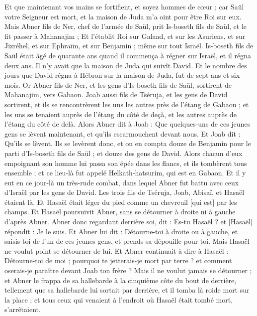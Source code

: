 \begin{multicols}{2}
Et que maintenant vos mains se fortifient, et soyez hommes de cœur ; car Saül votre Seigneur est mort, et la maison de Juda m'a oint pour être Roi sur eux.
Mais Abner fils de Ner, chef de l'armée de Saül, prit Is-boseth fils de Saül, et le fit passer à Mahanajim ;
Et l'établit Roi sur Galaad, et sur les Asuriens, et sur Jizréhel, et sur Ephraïm, et sur Benjamin ; même sur tout Israël.
Is-boseth fils de Saül était âgé de quarante ans quand il commença à régner sur Israël, et il régna deux ans. Il n'y avait que la maison de Juda qui suivît David.
Et le nombre des jours que David régna à Hébron sur la maison de Juda, fut de sept ans et six mois.
Or Abner fils de Ner, et les gens d'Is-boseth fils de Saül, sortirent de Mahanajim, vers Gabaon.
Joab aussi fils de Tséruja, et les gens de David sortirent, et ils se rencontrèrent les uns les autres près de l'étang de Gabaon ; et les uns se tenaient auprès de l'étang du côté de deçà, et les autres auprès de l'étang du côté de delà.
Alors Abner dit à Joab : Que quelques-uns de ces jeunes gens se lèvent maintenant, et qu'ils escarmouchent devant nous. Et Joab dit : Qu'ils se lèvent.
Ils se levèrent donc, et on en compta douze de Benjamin pour le parti d'Is-boseth fils de Saül ; et douze des gens de David.
Alors chacun d'eux empoignant son homme lui passa son épée dans les flancs, et ils tombèrent tous ensemble ; et ce lieu-là fut appelé Helkath-hatsurim, qui est en Gabaon.
Et il y eut en ce jour-là un très-rude combat, dans lequel Abner fut battu avec ceux d'Israël par les gens de David.
Les trois fils de Tséruja, Joab, Abisaï, et Hasaël étaient là. Et Hasaël était léger du pied comme un chevreuil [qui est] par les champs.
Et Hasaël poursuivit Abner, sans se détourner à droite ni à gauche d'après Abner.
Abner donc regardant derrière soi, dit : Es-tu Hasaël ? et [Hasaël] répondit : Je le suis.
Et Abner lui dit : Détourne-toi à droite ou à gauche, et saisis-toi de l'un de ces jeunes gens, et prends sa dépouille pour toi. Mais Hasaël ne voulut point se détourner de lui.
Et Abner continuait à dire à Hasaël : Détourne-toi de moi ; pourquoi te jetterais-je mort par terre ? et comment oserais-je paraître devant Joab ton frère ?
Mais il ne voulut jamais se détourner ; et Abner le frappa de sa hallebarde à la cinquième côte du bout de derrière, tellement que sa hallebarde lui sortait par derrière, et il tomba là roide mort sur la place ; et tous ceux qui venaient à l'endroit où Hasaël était tombé mort, s'arrêtaient.

\end{multicols}
